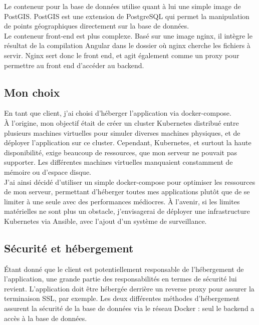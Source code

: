 Le conteneur pour la base de données utilise quant à lui une simple image de PostGIS.
PostGIS est une extension de PostgreSQL qui permet la manipulation de points géographiques directement sur la base de données.\\

Le conteneur front-end est plus complexe.
Basé sur une image nginx, il intègre le résultat de la compilation Angular dans le dossier où nginx cherche les fichiers à servir.
Nginx sert donc le front end, et agit également comme un proxy pour permettre au front end d'accéder au backend.

\subsection{Mon choix}\label{subsec:mon-choix}
En tant que client, j'ai choisi d'héberger l'application via docker-compose.\\

À l'origine, mon objectif était de créer un cluster Kubernetes distribué entre plusieurs machines virtuelles pour simuler
diverses machines physiques, et de déployer l'application sur ce cluster.
Cependant, Kubernetes, et surtout la haute disponibilité, exige beaucoup de ressources, que mon serveur ne pouvait pas supporter.
Les différentes machines virtuelles manquaient constamment de mémoire ou d'espace disque.\\

J'ai ainsi décidé d'utiliser un simple docker-compose pour optimiser les ressources de mon serveur,
permettant d'héberger toutes mes applications plutôt que de se limiter à une seule avec des performances médiocres.
À l'avenir, si les limites matérielles ne sont plus un obstacle, j'envisagerai de déployer une infrastructure Kubernetes via Ansible,
avec l'ajout d'un système de surveillance.

\subsection{Sécurité et hébergement}\label{subsec:securite-et-hebergement}
Étant donné que le client est potentiellement responsable de l'hébergement de l'application, une grande partie des
responsabilités en termes de sécurité lui revient.
L'application doit être hébergée derrière un reverse proxy pour assurer la terminaison SSL, par exemple.
Les deux différentes méthodes d'hébergement assurent la sécurité de la base de données via le réseau Docker : seul le backend
a accès à la base de données.\\

